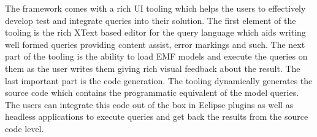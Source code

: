 The framework comes with a rich UI tooling which helps the users to effectively
develop test and integrate queries into their solution. The first element of the
tooling is the rich XText based editor for the query language which aids writing
well formed queries providing content assist, error markings and such. The next
part of the tooling is the ability to load EMF models and execute the queries on
them as the user writes them giving rich visual feedback about the result.
The last important part is the code generation. The tooling dynamically
generates the source code which contains the programmatic equivalent of the
model queries. The users can integrate this code out of the box in Eclipse
plugins as well as headless applications to execute queries and get back the
results from the source code level.




